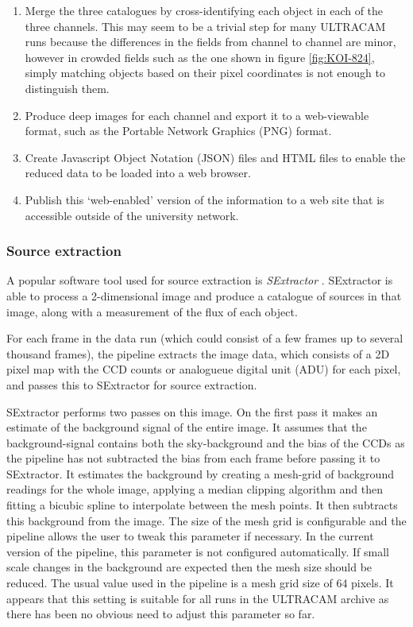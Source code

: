 \begin{enumerate}
	\item Merge the three catalogues by cross-identifying each object in each of the three channels. This may seem to be a trivial step for many ULTRACAM runs because the differences in the fields from channel to channel are minor, however in crowded fields such as the one shown in figure \ref{fig:KOI-824}, simply matching objects based on their pixel coordinates is not enough to distinguish them.
	\item Produce deep images for each channel and export it to a web-viewable format, such as the Portable Network Graphics (PNG) format. 
	\item Create Javascript Object Notation (JSON) files and HTML files to enable the reduced data to be loaded into a web browser.
	\item Publish this `web-enabled' version of the information to a web site that is accessible outside of the university network.  
\end{enumerate}

\subsubsection{Source extraction}
A popular software tool used for source extraction is \emph{SExtractor} \citep{bertin}. SExtractor is able to process a 2-dimensional image and produce a catalogue of sources in that image, along with a measurement of the flux of each object. 

For each frame in the data run (which could consist of a few frames up to several thousand frames), the pipeline extracts the image data, which consists of a 2D pixel map with the CCD counts or analogueue digital unit (ADU) for each pixel, and passes this to SExtractor for source extraction. 

SExtractor performs two passes on this image. On the first pass it makes an estimate of the background signal of the entire image. It assumes that the background-signal contains both the sky-background and the bias of the CCDs as the pipeline has not subtracted the bias from each frame before passing it to SExtractor. It estimates the background by creating a mesh-grid of background readings for the whole image, applying a median clipping algorithm and then fitting a bicubic spline to interpolate between the mesh points. It then subtracts this background from the image. The size of the mesh grid is configurable and the pipeline allows the user to tweak this parameter if necessary. In the current version of the pipeline, this parameter is not configured automatically.  If small scale changes in the background are expected then the mesh size should be reduced. The usual value used in the pipeline is a mesh grid size of 64 pixels. It appears that this setting is suitable for all runs in the ULTRACAM archive as there has been no obvious need to adjust this parameter so far. 

